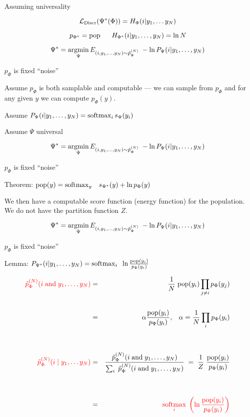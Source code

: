 {\vfill
Assuming universality

\vfill
$${\cal L}_{\mathrm{Discr}}(\Psi^*(\Phi)) = H_\Phi(i|y_1,\ldots y_{N})$$

\vfill
$$p_{\Phi^*} = \mathrm{pop}\;\;\;\;\;\;H_{\Phi^*}(i|y_1,\ldots,y_N) = \ln N$$


{\color{red}
$$\Psi^* = \operatorname*{argmin}_\Psi E_{(i,y_1,\ldots,y_{N}) \sim \tilde{p}_\Phi^{(N)}} \;- \ln P_\Psi(i|y_1,\ldots,y_{N})$$
\centerline{$p_\Phi$ is fixed ``noise''}
}

\vfill
Assume $p_\Phi$ is both samplable and computable --- we can sample from $p_\Phi$ and for any given $y$ we can compute $p_\Phi(y)$.

\vfill
Assume $P_\Psi(i|y_1,\ldots,y_{N}) = \operatorname*{softmax}_i s_\Psi(y_i)$

\vfill
Assume $\Psi$ universal



$$\Psi^* = \operatorname*{argmin}_\Psi E_{(i,y_1,\ldots,y_{N}) \sim \tilde{p}_\Phi^{(N)}} \;- \ln P_\Psi(i|y_1,\ldots,y_{N})$$
\centerline{$p_\Phi$ is fixed ``noise''}

\vfill
Theorem: {\color{red} $\mathrm{pop}(y) = \operatorname*{softmax}_y\;\;\; s_{\Psi^*}(y) + \ln p_\Phi(y)$}

\vfill
We then have a computable score function (energy function) for the population.  We do not have the partition function $Z$.


$$\Psi^* = \operatorname*{argmin}_\Psi E_{(i,y_1,\ldots,y_{N}) \sim \tilde{p}_\Phi^{(N)}} \;- \ln P_\Psi(i|y_1,\ldots,y_{N})$$
\centerline{$p_\Phi$ is fixed ``noise''}

\vfill
Lemma: {\color{red} $P_{\Psi^*}(i|y_1,\ldots,y_{N})  =  \operatorname*{softmax}_i\;\; \ln \frac{\mathrm{pop}(y_i)}{p_\Phi(y_i)}$}

{\huge
\begin{eqnarray*}
{\color{red} \tilde{p}_\Phi^{(N)}(i \;\mathrm{and}\;y_1,\ldots,y_{N})} & = & \frac{1}{N}\;\mathrm{pop}(y_i)\prod_{j \not = i}p_\Phi(y_j) \\
\\
& = & \alpha \frac{\mathrm{pop}(y_i)}{p_\Phi(y_i)},\;\;\;\alpha = \frac{1}{N} \prod_i p_\Phi(y_i) \\
\\
\\
{\color{red} \tilde{p}_\Phi^{(N)}(i\;|\;y_1,\ldots y_{N})} & = & \frac{\tilde{p}_\Phi^{(N)}(i\;\mbox{and} \; y_1,\ldots,y_{N})}{\sum_i \;\tilde{p}_\Phi^{(N)}(i \;\mbox{and}\; y_1,\ldots,y_{N})} \;=\;\frac{1}{Z} \;\frac{\mathrm{pop}(y_i)}{p_\Phi(y_i)} \\
\\
\\
& = & {\color{red} \operatorname*{softmax}_i\; \left(\ln \frac{\mathrm{pop}(y_i)}{p_\Phi(y_i)}\right)}
\end{eqnarray*}
}

}
